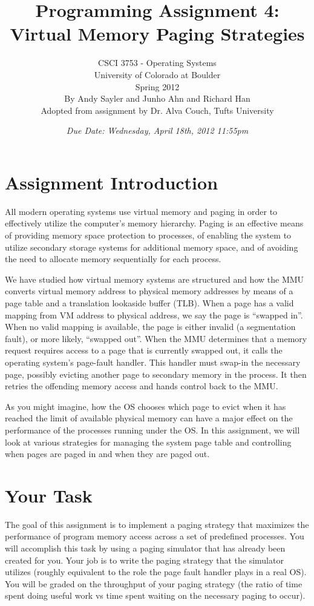 \documentclass[12pt]{article}
\title{Programming Assignment 4:\\Virtual Memory Paging Strategies}
\author{
  CSCI 3753 - Operating Systems\\
  University of Colorado at Boulder\\
  Spring 2012\\
  By Andy Sayler and Junho Ahn and Richard Han\\
  Adopted from assignment by Dr. Alva Couch, Tufts University\cite{couch-a5}
}
\date{\emph{Due Date: Wednesday, April 18th, 2012 11:55pm}}
\begin{document}
\maketitle

\section{Assignment Introduction}

All modern operating systems use virtual memory and paging in order to
effectively utilize the computer's memory hierarchy. Paging is an
effective means of providing memory space protection to processes, of
enabling the system to utilize secondary storage systems for additional
memory space, and of avoiding the need to allocate memory sequentially
for each process.

We have studied how virtual memory systems are structured and how the MMU
converts virtual memory address to physical memory addresses by
means of a page table and a translation lookaside buffer (TLB). When a
page has a valid mapping from VM address to physical address, we say
the page is ``swapped in''. When no valid mapping is available, the page
is either invalid (a segmentation fault), or more likely, ``swapped
out''. When the MMU determines that a memory request requires access to
a page that is currently swapped out, it calls the operating system's
page-fault handler. This handler must swap-in the necessary page,
possibly evicting another page to secondary memory in the process.
It then retries the
offending memory access and hands control back to the MMU.

As you might imagine, how the OS chooses which page to evict when it
has reached the limit of available physical memory can have a major
effect on the performance of the processes running under the OS.
In this assignment, we will look at various strategies for managing
the system page table and controlling when pages are paged in and when
they are paged out.

\section{Your Task}

The goal of this assignment is to implement a paging strategy that
maximizes the performance of program memory access across a
set of predefined processes. You will accomplish this task by using a
paging simulator that has already been created for you. Your job is to
write the paging strategy that the simulator utilizes (roughly
equivalent to the role the page fault handler plays in a real OS).
You will be graded
on the throughput of your paging strategy (the ratio of time spent doing
useful work vs time spent waiting on the necessary paging to occur).
\end{document}
